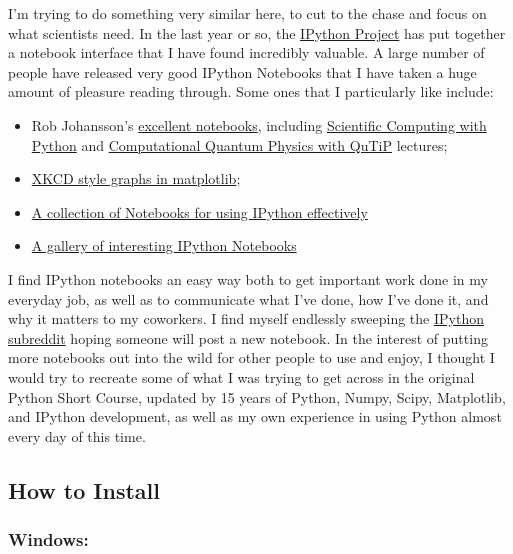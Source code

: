 \documentclass[11pt]{article}
\providecommand{\tightlist}{%
      \setlength{\itemsep}{0pt}\setlength{\parskip}{0pt}}
\begin{document}
I'm trying to do something very similar here, to cut to the chase and
focus on what scientists need. In the last year or so, the
\href{http://ipython.org}{IPython Project} has put together a notebook
interface that I have found incredibly valuable. A large number of
people have released very good IPython Notebooks that I have taken a
huge amount of pleasure reading through. Some ones that I particularly
like include:

\begin{itemize}
\tightlist
\item
  Rob Johansson's \href{http://jrjohansson.github.io/}{excellent
  notebooks}, including
  \href{https://github.com/jrjohansson/scientific-python-lectures}{Scientific
  Computing with Python} and
  \href{https://github.com/jrjohansson/qutip-lectures}{Computational
  Quantum Physics with QuTiP} lectures;
\item
  \href{http://nbviewer.ipython.org/url/jakevdp.github.com/downloads/notebooks/XKCD_plots.ipynb}{XKCD
  style graphs in matplotlib};
\item
  \href{https://github.com/ipython/ipython/tree/master/examples/notebooks\#a-collection-of-notebooks-for-using-ipython-effectively}{A
  collection of Notebooks for using IPython effectively}
\item
  \href{https://github.com/ipython/ipython/wiki/A-gallery-of-interesting-IPython-Notebooks}{A
  gallery of interesting IPython Notebooks}
\end{itemize}

I find IPython notebooks an easy way both to get important work done in
my everyday job, as well as to communicate what I've done, how I've done
it, and why it matters to my coworkers. I find myself endlessly sweeping
the \href{http://ipython.reddit.com}{IPython subreddit} hoping someone
will post a new notebook. In the interest of putting more notebooks out
into the wild for other people to use and enjoy, I thought I would try
to recreate some of what I was trying to get across in the original
Python Short Course, updated by 15 years of Python, Numpy, Scipy,
Matplotlib, and IPython development, as well as my own experience in
using Python almost every day of this time.

    \subsection{How to Install}\label{how-to-install}

\subsubsection{Windows:}\label{windows}
\end{document}
